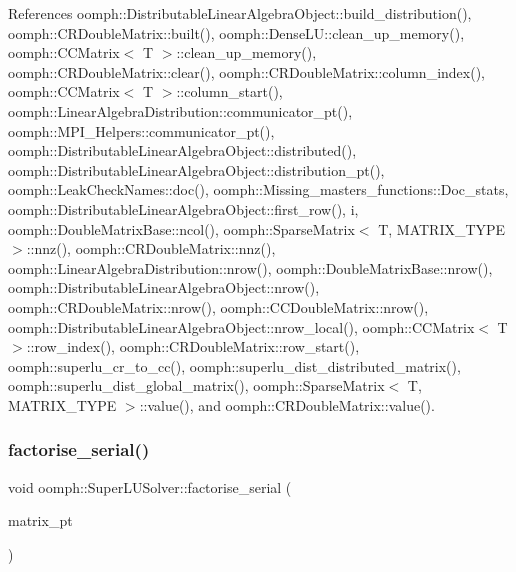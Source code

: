 References oomph\+::\+Distributable\+Linear\+Algebra\+Object\+::build\+\_\+distribution(), oomph\+::\+C\+R\+Double\+Matrix\+::built(), oomph\+::\+Dense\+L\+U\+::clean\+\_\+up\+\_\+memory(), oomph\+::\+C\+C\+Matrix$<$ T $>$\+::clean\+\_\+up\+\_\+memory(), oomph\+::\+C\+R\+Double\+Matrix\+::clear(), oomph\+::\+C\+R\+Double\+Matrix\+::column\+\_\+index(), oomph\+::\+C\+C\+Matrix$<$ T $>$\+::column\+\_\+start(), oomph\+::\+Linear\+Algebra\+Distribution\+::communicator\+\_\+pt(), oomph\+::\+M\+P\+I\+\_\+\+Helpers\+::communicator\+\_\+pt(), oomph\+::\+Distributable\+Linear\+Algebra\+Object\+::distributed(), oomph\+::\+Distributable\+Linear\+Algebra\+Object\+::distribution\+\_\+pt(), oomph\+::\+Leak\+Check\+Names\+::doc(), oomph\+::\+Missing\+\_\+masters\+\_\+functions\+::\+Doc\+\_\+stats, oomph\+::\+Distributable\+Linear\+Algebra\+Object\+::first\+\_\+row(), i, oomph\+::\+Double\+Matrix\+Base\+::ncol(), oomph\+::\+Sparse\+Matrix$<$ T, M\+A\+T\+R\+I\+X\+\_\+\+T\+Y\+P\+E $>$\+::nnz(), oomph\+::\+C\+R\+Double\+Matrix\+::nnz(), oomph\+::\+Linear\+Algebra\+Distribution\+::nrow(), oomph\+::\+Double\+Matrix\+Base\+::nrow(), oomph\+::\+Distributable\+Linear\+Algebra\+Object\+::nrow(), oomph\+::\+C\+R\+Double\+Matrix\+::nrow(), oomph\+::\+C\+C\+Double\+Matrix\+::nrow(), oomph\+::\+Distributable\+Linear\+Algebra\+Object\+::nrow\+\_\+local(), oomph\+::\+C\+C\+Matrix$<$ T $>$\+::row\+\_\+index(), oomph\+::\+C\+R\+Double\+Matrix\+::row\+\_\+start(), oomph\+::superlu\+\_\+cr\+\_\+to\+\_\+cc(), oomph\+::superlu\+\_\+dist\+\_\+distributed\+\_\+matrix(), oomph\+::superlu\+\_\+dist\+\_\+global\+\_\+matrix(), oomph\+::\+Sparse\+Matrix$<$ T, M\+A\+T\+R\+I\+X\+\_\+\+T\+Y\+P\+E $>$\+::value(), and oomph\+::\+C\+R\+Double\+Matrix\+::value().

\mbox{\label{classoomph_1_1SuperLUSolver_a6b1ce356d11fa878315e9b32ac566748}} 
\subsubsection{\texorpdfstring{factorise\+\_\+serial()}{factorise\_serial()}}
{\footnotesize\ttfamily void oomph\+::\+Super\+L\+U\+Solver\+::factorise\+\_\+serial (\begin{DoxyParamCaption}\item[{\hyperlink{classoomph_1_1DoubleMatrixBase}{Double\+Matrix\+Base} $\ast$const \&}]{matrix\+\_\+pt }\end{DoxyParamCaption})\hspace{0.3cm}{\ttfamily [private]}}



